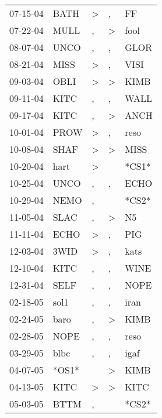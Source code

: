 \begin{supertabular}{lllll}
 07-15-04 &   BATH &     \textgreater &                , &     FF \\
 07-22-04 &   MULL &                , &     \textgreater &   fool \\
 08-07-04 &   UNCO &                , &                , &   GLOR \\
 08-21-04 &   MISS &     \textgreater &                , &   VISI \\
 09-03-04 &   OBLI &     \textgreater &     \textgreater &   KIMB \\
 09-11-04 &   KITC &                , &                , &   WALL \\
 09-17-04 &   KITC &                , &     \textgreater &   ANCH \\
 10-01-04 &   PROW &     \textgreater &                , &   reso \\
 10-08-04 &   SHAF &     \textgreater &     \textgreater &   MISS \\
 10-20-04 &   hart &     \textgreater &                  &  *CS1* \\
 10-25-04 &   UNCO &                , &                , &   ECHO \\
 10-29-04 &   NEMO &                , &                  &  *CS2* \\
 11-05-04 &   SLAC &                , &     \textgreater &     N5 \\
 11-11-04 &   ECHO &     \textgreater &                , &    PIG \\
 12-03-04 &   3WID &     \textgreater &                , &   kats \\
 12-10-04 &   KITC &                , &                , &   WINE \\
 12-31-04 &   SELF &                , &                , &   NOPE \\
 02-18-05 &   sol1 &                , &                , &   iran \\
 02-24-05 &   baro &                , &     \textgreater &   KIMB \\
 02-28-05 &   NOPE &                , &                , &   reso \\
 03-29-05 &   blbc &                , &                , &   igaf \\
 04-07-05 &  *OS1* &                  &     \textgreater &   KIMB \\
 04-13-05 &   KITC &     \textgreater &     \textgreater &   KITC \\
 05-03-05 &   BTTM &                , &                  &  *CS2* \\

\end{supertabular}
